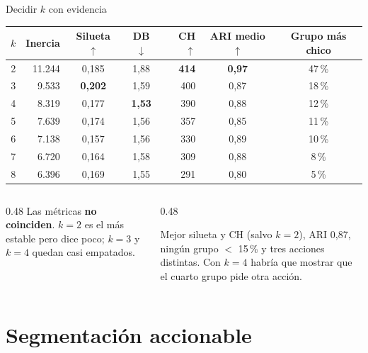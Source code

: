 \documentclass[aspectratio=169,12pt]{beamer}
\newcommand{\hrow}{\rowcolor{mlcream}}
\renewcommand{\arraystretch}{1.15}
\begin{document}
\begin{frame}{Decidir $k$ con evidencia}
  \centering\scriptsize\renewcommand{\arraystretch}{1.0}
  \begin{tabular}{@{}c r c c r c c@{}}
    \toprule
    \hrow $k$ & \textbf{Inercia} & \textbf{Silueta} $\uparrow$ & \textbf{DB} $\downarrow$ & \textbf{CH} $\uparrow$ & \textbf{ARI medio} $\uparrow$ & \textbf{Grupo más chico} \\
    \midrule
    2 & 11.244 & 0,185 & 1,88 & \textbf{414} & \textbf{0,97} & 47\,\% \\
    \rowcolor{eafitsky!40} 3 & 9.533 & \textbf{0,202} & 1,59 & 400 & 0,87 & 18\,\% \\
    4 & 8.319 & 0,177 & \textbf{1,53} & 390 & 0,88 & 12\,\% \\
    5 & 7.639 & 0,174 & 1,56 & 357 & 0,85 & 11\,\% \\
    6 & 7.138 & 0,157 & 1,56 & 330 & 0,89 & 10\,\% \\
    7 & 6.720 & 0,164 & 1,58 & 309 & 0,88 & 8\,\% \\
    8 & 6.396 & 0,169 & 1,55 & 291 & 0,80 & 5\,\% \\
    \bottomrule
  \end{tabular}\par
  \vspace{6pt}
  \raggedright
  \begin{columns}[T]
    \begin{column}{0.48\textwidth}
      \footnotesize Las métricas \textbf{no coinciden}. $k=2$ es el más estable pero dice poco; $k=3$ y $k=4$ quedan casi empatados.
    \end{column}
    \begin{column}{0.48\textwidth}
      \begin{keybox}[Elección: $k=3$]
        \footnotesize Mejor silueta y CH (salvo $k=2$), ARI 0,87, ningún grupo $<$ 15\,\% y tres acciones distintas. Con $k=4$ habría que mostrar que el cuarto grupo pide otra acción.
      \end{keybox}
    \end{column}
  \end{columns}
\end{frame}

\section{Segmentación accionable}
\end{document}
